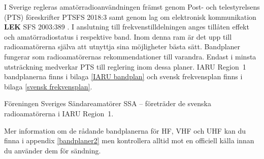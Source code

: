 I Sverige regleras amatörradioanvändningen främst genom Post- och
telestyrelsens (PTS) föreskrifter PTSFS 2018:3 \cite{PTSFS2018:3} samt genom lag
om elektronisk kommunikation \textbf{LEK} SFS 2003:389 \cite{SFS2003:389}.
I anslutning till frekvenstilldelningen anges tillåten effekt och
amatörradiostatus i respektive band.
Inom denna ram är det upp till radioamatörerna själva att utnyttja sina
möjligheter bästa sätt.
Bandplaner fungerar som radioamatörernas rekommendationer till varandra.
Endast i minsta utsträckning medverkar PTS till reglering inom dessa planer.
IARU Region~1 bandplanerna finns i bilaga \ref{IARU bandplan} och svensk
frekvensplan finns i bilaga \ref{svensk frekvensplan}.

\newpage %
Föreningen Sveriges Sändareamatörer SSA -- företräder de svenska
radioamatörerna i IARU Region~1.

Mer information om de rådande bandplanerna för HF, VHF och UHF kan du finna i
appendix \ref{bandplaner2} men kontrollera alltid mot en officiell källa innan
du använder dem för sändning.
